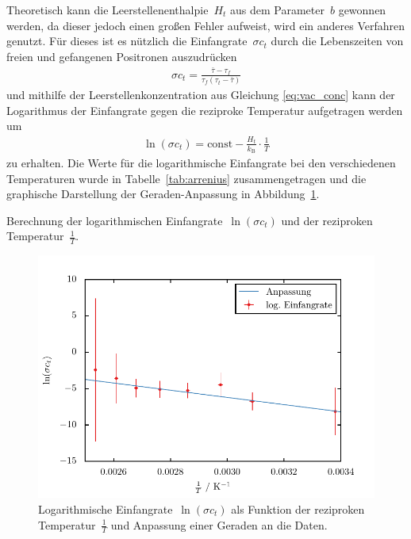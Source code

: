 \documentclass[11pt, a4paper]{article}
\numberwithin{equation}{section}
\begin{document}
Theoretisch kann die Leerstellenenthalpie~$H_t$ aus dem Parameter~$b$ gewonnen werden, da dieser jedoch einen großen Fehler aufweist, wird ein anderes Verfahren genutzt.
Für dieses ist es nützlich die Einfangrate~$\sigma c_t$ durch die Lebenszeiten von freien und gefangenen Positronen auszudrücken \cite{add_infos}
\begin{align*}
	\sigma c_t = \frac{\bar{\tau} - \tau_f}{\tau_f (\tau_t - \bar{\tau})}
\end{align*}
und mithilfe der Leerstellenkonzentration aus Gleichung \eqref{eq:vac_conc} kann der Logarithmus der Einfangrate gegen die reziproke Temperatur aufgetragen werden um
\begin{align}
	\ln(\sigma c_t) = \mathrm{const} - \frac{H_t}{k_\mathrm{B}} \cdot \frac{1}{T} \label{eq:logogogogo}
\end{align}
zu erhalten.
Die Werte für die logarithmische Einfangrate bei den verschiedenen Temperaturen wurde in Tabelle~\ref{tab:arrenius} zusammengetragen und die graphische Darstellung der Geraden-Anpassung in Abbildung~\ref{fig:arrenius}.
\begin{table}[h]
	\centering
	
	\caption{Berechnung der logarithmischen Einfangrate~$\ln(\sigma c_t)$ und der reziproken Temperatur~$\frac{1}{T}$.}
	\label{tab:arrenius}
\end{table}
\begin{figure}[h]
	\centering
	\includegraphics{./figures/arrenius.pdf}
	\caption{Logarithmische Einfangrate~$\ln(\sigma c_t)$ als Funktion der reziproken Temperatur~$\frac{1}{T}$ und Anpassung einer Geraden an die Daten.}
	\label{fig:arrenius}
\end{figure}
\end{document}
